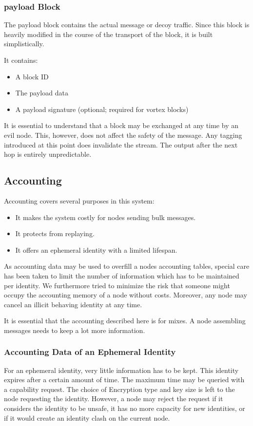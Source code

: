 
\subsubsection{payload Block}
The payload block contains the actual message or decoy traffic. Since this block is heavily modified in the course of the transport of the block, it is built simplistically.

It contains:
\begin{itemize}
	\item A block ID
	\item The payload data
	\item A payload signature (optional; required for vortex blocks)
\end{itemize}

It is essential to understand that a block may be exchanged at any time by an evil node. This, however, does not affect the safety of the message. Any tagging introduced at this point does invalidate the stream. The output after the next hop is entirely unpredictable.

\subsection{Accounting\label{sec:accounting}}
Accounting covers several purposes in this system:
\begin{itemize}
	\item It makes the system costly for nodes sending bulk messages.
	\item It protects from replaying.
	\item It offers an ephemeral identity with a limited lifespan.
\end{itemize}

As accounting data may be used to overfill a nodes accounting tables, special care has been taken to limit the number of information which has to be maintained per identity. We furthermore tried to minimize the risk that someone might occupy the accounting memory of a node without costs. Moreover, any node may cancel an illicit behaving identity at any time.

It is essential that the accounting described here is for mixes. A node assembling messages needs to keep a lot more information.

\subsubsection{Accounting Data of an Ephemeral Identity}
For an ephemeral identity, very little information has to be kept. This identity expires after a certain amount of time. The maximum time may be queried with a capability request. The choice of Encryption type and key size is left to the node requesting the identity. However, a node may reject the request if it considers the identity to be unsafe, it has no more capacity for new identities, or if it would create an identity clash on the current node.

